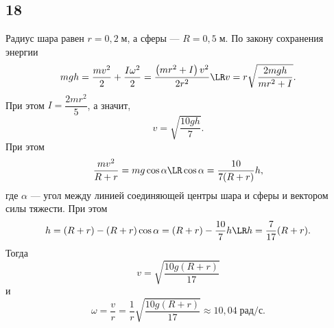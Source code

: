 \subsection{18}

Радиус шара равен $r=0{,}2\;\text{м}$, а сферы --- $R=0{,}5\;\text{м}$. По закону сохранения энергии
\[
mgh=\frac{mv^2}{2}+\frac{I\omega^2}{2}=\frac{\left(mr^2+I\right)v^2}{2r^2}\LR v=r\sqrt{\frac{2mgh}{mr^2+I}}.
\]
При этом $I=\dfrac{2mr^2}{5}$, а значит,
\[
v=\sqrt{\frac{10gh}{7}}.
\]
При этом
\[
\frac{mv^2}{R+r}=mg\cos\alpha\LR\cos\alpha=\frac{10}{7(R+r)}h,
\]
где $\alpha$ --- угол между линией соединяющей центры шара и сферы и вектором силы тяжести. При этом
\[
h=(R+r)-(R+r)\cos\alpha=(R+r)-\frac{10}{7}h\LR h=\frac{7}{17}(R+r).
\]
Тогда
\[
v=\sqrt{\frac{10g(R+r)}{17}}
\]
и
\[
\omega=\frac{v}{r}=\frac{1}{r}\sqrt{\frac{10g(R+r)}{17}}\approx10{,}04\;\text{рад/с}.
\]
